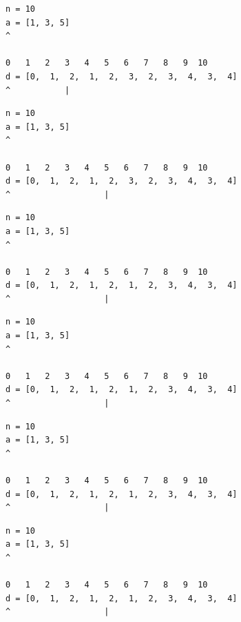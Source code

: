 \begin{frame}[fragile]
\begin{verbatim}
n = 10
a = [1, 3, 5]
^

0   1   2   3   4   5   6   7   8   9  10
d = [0,  1,  2,  1,  2,  3,  2,  3,  4,  3,  4]
^           |
\end{verbatim}
\end{frame}
\addtocounter{framenumber}{-1}

\begin{frame}[fragile]
\begin{verbatim}
n = 10
a = [1, 3, 5]
^

0   1   2   3   4   5   6   7   8   9  10
d = [0,  1,  2,  1,  2,  3,  2,  3,  4,  3,  4]
^                   |
\end{verbatim}
\end{frame}
\addtocounter{framenumber}{-1}

\begin{frame}[fragile]
\begin{verbatim}
n = 10
a = [1, 3, 5]
^

0   1   2   3   4   5   6   7   8   9  10
d = [0,  1,  2,  1,  2,  1,  2,  3,  4,  3,  4]
^                   |
\end{verbatim}
\end{frame}
\addtocounter{framenumber}{-1}

\begin{frame}[fragile]
\begin{verbatim}
n = 10
a = [1, 3, 5]
^

0   1   2   3   4   5   6   7   8   9  10
d = [0,  1,  2,  1,  2,  1,  2,  3,  4,  3,  4]
^                   |
\end{verbatim}
\end{frame}
\addtocounter{framenumber}{-1}

\begin{frame}[fragile]
\begin{verbatim}
n = 10
a = [1, 3, 5]
^

0   1   2   3   4   5   6   7   8   9  10
d = [0,  1,  2,  1,  2,  1,  2,  3,  4,  3,  4]
^                   |
\end{verbatim}
\end{frame}
\addtocounter{framenumber}{-1}

\begin{frame}[fragile]
\begin{verbatim}
n = 10
a = [1, 3, 5]
^

0   1   2   3   4   5   6   7   8   9  10
d = [0,  1,  2,  1,  2,  1,  2,  3,  4,  3,  4]
^                   |
\end{verbatim}
\end{frame}
\addtocounter{framenumber}{-1}

